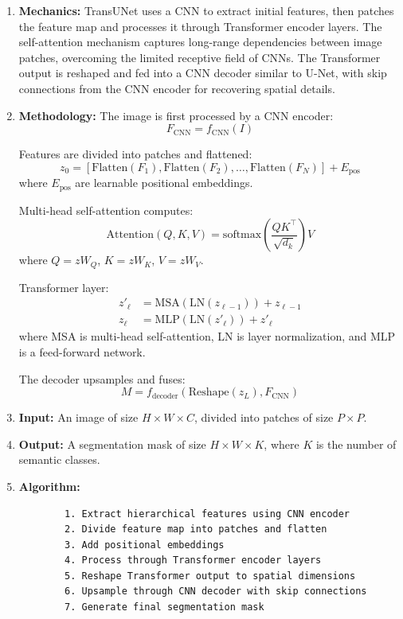 \documentclass[conference]{IEEEtran}
\begin{document}
\begin{enumerate}
	\item \textbf{Mechanics:}
	TransUNet uses a CNN to extract initial features, then patches the feature map and processes it through Transformer encoder layers. The self-attention mechanism captures long-range dependencies between image patches, overcoming the limited receptive field of CNNs. The Transformer output is reshaped and fed into a CNN decoder similar to U-Net, with skip connections from the CNN encoder for recovering spatial details.
	
	\item \textbf{Methodology:}
	The image is first processed by a CNN encoder:
	\[
	F_{\text{CNN}} = f_{\text{CNN}}(I)
	\]
	
	Features are divided into patches and flattened:
	\[
	z_0 = [\text{Flatten}(F_1), \text{Flatten}(F_2), \ldots, \text{Flatten}(F_N)] + E_{\text{pos}}
	\]
	where $E_{\text{pos}}$ are learnable positional embeddings.
	
	Multi-head self-attention computes:
	\[
	\text{Attention}(Q, K, V) = \text{softmax}\left(\frac{QK^\top}{\sqrt{d_k}}\right)V
	\]
	where $Q = z W_Q$, $K = z W_K$, $V = z W_V$.
	
	Transformer layer:
	\begin{align*}
		z'_\ell &= \text{MSA}(\text{LN}(z_{\ell-1})) + z_{\ell-1} \\
		z_\ell &= \text{MLP}(\text{LN}(z'_\ell)) + z'_\ell
	\end{align*}
	where MSA is multi-head self-attention, LN is layer normalization, and MLP is a feed-forward network.
	
	The decoder upsamples and fuses:
	\[
	M = f_{\text{decoder}}(\text{Reshape}(z_L), F_{\text{CNN}})
	\]
	
	\item \textbf{Input:}
	An image of size $H \times W \times C$, divided into patches of size $P \times P$.
	
	\item \textbf{Output:}
	A segmentation mask of size $H \times W \times K$, where $K$ is the number of semantic classes.
	
	\item \textbf{Algorithm:}
	\begin{lstlisting}
		1. Extract hierarchical features using CNN encoder
		2. Divide feature map into patches and flatten
		3. Add positional embeddings
		4. Process through Transformer encoder layers
		5. Reshape Transformer output to spatial dimensions
		6. Upsample through CNN decoder with skip connections
		7. Generate final segmentation mask
	\end{lstlisting}
\end{enumerate}
\end{document}
